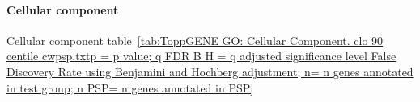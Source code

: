 \begin{table}[ht]
\label{tab:ToppGENE GO: Biological Process. clo 90 centile cwpsp.txtp = p value; q FDR B H = q adjusted significance level False Discovery Rate using Benjamini and Hochberg adjustment; n= n genes annotated in test group; n PSP= n genes annotated in PSP}
\end{table}





\paragraph{Cellular component}
Cellular component table~\ref{tab:ToppGENE GO: Cellular Component. clo 90 centile cwpsp.txtp = p value; q FDR B H = q adjusted significance level False Discovery Rate using Benjamini and Hochberg adjustment; n= n genes annotated in test group; n PSP= n genes annotated in PSP}

